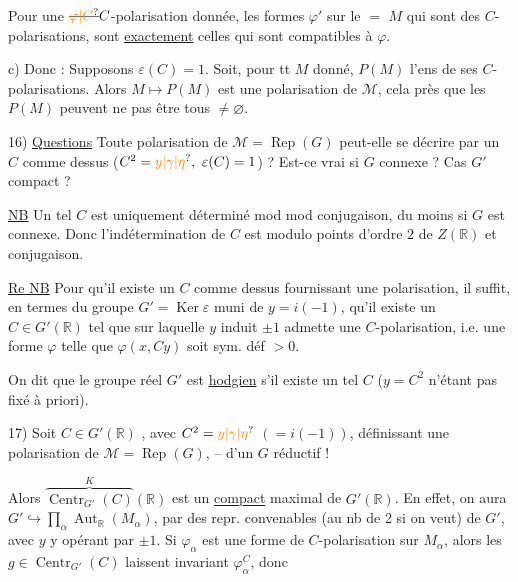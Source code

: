 
Pour  une $\deleted{\unsure{\varphi|C}}C$-polarisation donnée, les formes $\varphi'$ sur le $=$ $M$ qui sont des $C$-polarisations, sont \uline{exactement} celles qui sont compatibles à $\varphi$.

c) Donc : Supposons $\varepsilon(C)=1$. Soit, pour tt $M$ donné, $P(M)$ l'ens de ses $C$-polarisations. Alors $M\mapsto P(M)$ est une polarisation de $\mathcal M$,  cela près que les $P(M)$ peuvent ne pas être tous $\ne\varnothing$.

16) \uline{Questions} Toute polarisation de  $\mathcal M=\operatorname{Rep}(G)$ peut-elle se décrire par un $C$ comme dessus ($C^2=\unsure{y|\gamma|\eta},\ \varepsilon(C)=1$) ? Est-ce vrai si $G$ connexe ? Cas $G'$  compact ?


\uline{NB} Un tel $C$  est uniquement déterminé mod   mod conjugaison,  du moins si $G$ est connexe. Donc  l'indétermination de $C$  est modulo points d'ordre $2$ de $Z(\mathbb R)$ et conjugaison.

\uline{Re NB} Pour qu'il existe un $C$ comme dessus fournissant une polarisation, il  suffit, en termes du groupe $G'=\operatorname{Ker}\varepsilon$ muni de $y=i(-1)$, qu'il existe un $C\in G'(\mathbb R)$ tel que \uline{}   sur laquelle $y$ induit $\pm1$ admette une $C$-polarisation, i.e. une forme  $\varphi$ telle que $\varphi(x,Cy)$ soit sym. déf $>0$.

On dit que le groupe  réel $G'$ est \uline{hodgien} s'il existe un tel $C$   ($y=C^2$ n'étant pas fixé à priori).


17) Soit $C\in G'(\mathbb R)$ \deleted{\unsure{$\varepsilon$}}, avec $C^2=\unsure{y|\gamma|\eta}$ $(=i(-1))$, définissant une polarisation de $\mathcal M=\operatorname{Rep}(G)$, -- d'un $G$ réductif !

Alors $\overbrace{\operatorname{Centr}_{G'}(C)}^{K}(\mathbb R)$ est un \uline{compact} maximal de $G'(\mathbb R)$. En effet, on  \deleted{\unsure{$\varphi$}} aura  $G'\hookrightarrow\prod_\alpha\operatorname{Aut}_{\mathbb R}(M_\alpha)$, par des repr. convenables (au nb de 2 si on veut) de $G'$,  avec $y$ y opérant par $\pm1$. Si $\varphi_\alpha$ est une forme de $C$-polarisation sur $M_\alpha$, alors les $g\in\operatorname{Centr}_{G'}(C)$ laissent invariant $\varphi_\alpha^C$, donc

